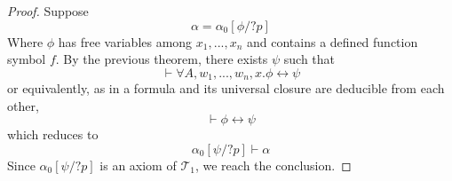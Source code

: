 \begin{proof}
Suppose
$$
\alpha = \alpha_0[\phi / ?p]
$$
Where $\phi$ has free variables among $x_1,...,x_n$ and contains a defined function symbol $f$. By the previous theorem, there exists $\psi$ such that
$$\vdash \forall A, w_1, ..., w_n, x. \phi \leftrightarrow \psi$$
or equivalently, as in a formula and its universal closure are deducible from each other,
$$\vdash \phi \leftrightarrow \psi$$
which reduces to
$$
\alpha_0[\psi / ?p] \vdash \alpha
$$
Since $\alpha_0[\psi / ?p]$ is an axiom of $\mathcal{T}_1$, we reach the conclusion.
\end{proof}

